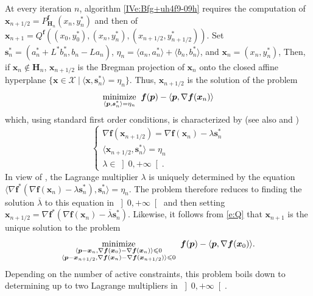 \documentclass[a4paper,11pt,fleqn]{article}
\renewcommand{\leq}{\ensuremath{\leqslant}}
\newcommand{\minimize}[2]{\ensuremath{\underset{\substack{{#1}}}%
{\text{\rm minimize}}\;\;#2 }}
\newcommand{\pair}[2]{\langle{{#1},{#2}}\rangle}
\newcommand{\menge}[2]{\big\{{#1}~\big |~{#2}\big\}}
\newcommand{\XXX}{\ensuremath{\boldsymbol{\mathcal X}}}
\newcommand{\RPP}{\ensuremath{\left]0,+\infty\right[}}
\theoremstyle{plain}{\theorembodyfont{\rmfamily}%
\newtheorem{conjecture}[theorem]{Conjecture}}
\theoremstyle{plain}{\theorembodyfont{\rmfamily}%
\newtheorem{example}[theorem]{Example}}
\theoremstyle{plain}{\theorembodyfont{\rmfamily}%
\newtheorem{remark}[theorem]{Remark}}
\theoremstyle{plain}{\theorembodyfont{\rmfamily}%
\newtheorem{algorithm}[theorem]{Algorithm}}
\theoremstyle{plain}{\theorembodyfont{\rmfamily}%
\newtheorem{condition}[theorem]{Condition}}
\theoremstyle{plain}{\theorembodyfont{\rmfamily}%
\newtheorem{definition}[theorem]{Definition}}
\theoremstyle{plain}{\theorembodyfont{\rmfamily}
\newtheorem{problem}[theorem]{Problem}}
\theoremstyle{plain}{\theorembodyfont{\rmfamily}
\newtheorem{notation}[theorem]{Notation}}
\numberwithin{equation}{section}
\begin{document}
\begin{remark}
\label{rvb8uh4504}
At every iteration $n$, algorithm \eqref{IVe:Bfg+uh4f9-09h}
requires the computation of $\boldsymbol{x}_{n+1/2}=
P_{\boldsymbol{H}_n}^{\boldsymbol{f}}(x_n,y_n^*)$ and then of
$\boldsymbol{x}_{n+1}=Q^{\boldsymbol{f}}((x_0,y_0^*),(x_n,y_n^*),
(x_{n+1/2},y_{n+1/2}^*))$. 
Set $\boldsymbol{s}_n^*=(a_n^*+L^*b_n^*,b_n-La_n)$, 
$\eta_n=\pair{a_n}{a_n^*}+\pair{b_n}{b_n^*}$, and
$\boldsymbol{x}_n=(x_n,y_n^*)$,
Then, if $\boldsymbol{x}_n\not\in\boldsymbol{H}_n$, 
$\boldsymbol{x}_{n+1/2}$ is the Bregman projection of 
$\boldsymbol{x}_n$ onto the closed affine 
hyperplane $\menge{\boldsymbol{x}\in\XXX}
{\pair{\boldsymbol{x}}{\boldsymbol{s}_n^*}=\eta_n}$. Thus,
$\boldsymbol{x}_{n+1/2}$ is the solution of the problem 
\begin{equation}
\label{evb8uh4505a}
\minimize{\pair{\boldsymbol{p}}{\boldsymbol{s}_n^*}=\eta_n}
{\boldsymbol{f}(\boldsymbol{p})-\pair{\boldsymbol{p}}{\nabla
\boldsymbol{f}(\boldsymbol{x}_n)}}
\end{equation}
which, using standard first order conditions, is characterized by
(see also \cite[Remark~6.13]{BB97} and 
\cite[Lemma~2.2.1]{Cens97}) 
\begin{equation}
\label{evb8uh4505b}
\begin{cases}
\nabla\boldsymbol{f}(\boldsymbol{x}_{n+1/2})=\nabla
\boldsymbol{f}(\boldsymbol{x}_n)-\lambda\boldsymbol{s}_n^*\\
\pair{\boldsymbol{x}_{n+1/2}}{\boldsymbol{s}_n^*}=\eta_n\\
\lambda\in\RPP.
\end{cases}
\end{equation}
In view of \cite[Theorem~5.10]{Ccm01}, the Lagrange multiplier 
$\lambda$ is uniquely determined by the equation 
$\pair{\nabla\boldsymbol{f}^*(\nabla\boldsymbol{f}
(\boldsymbol{x}_n)-\lambda\boldsymbol{s}_n^*)}
{\boldsymbol{s}_n^*}=\eta_n$. The problem therefore reduces to
finding the solution $\overline{\lambda}$ to this equation in $\RPP$
and then setting $\boldsymbol{x}_{n+1/2}=\nabla\boldsymbol{f}^*(
\nabla\boldsymbol{f}(\boldsymbol{x}_n)-\overline{\lambda}
\boldsymbol{s}_n^*)$. Likewise, it follows from \eqref{e:Q} that 
$\boldsymbol{x}_{n+1}$ is the unique solution to the problem 
\begin{equation}
\label{evb8uh4505c}
\minimize{\substack{\pair{\boldsymbol{p}-\boldsymbol{x}_n}
{\nabla\boldsymbol{f}(\boldsymbol{x}_0)-
\nabla\boldsymbol{f}(\boldsymbol{x}_n)}\leq 0\\
\pair{\boldsymbol{p}-\boldsymbol{x}_{n+1/2}}
{\nabla\boldsymbol{f}(\boldsymbol{x}_{n})-
\nabla\boldsymbol{f}(\boldsymbol{x}_{n+1/2})}\leq 0}}
{\boldsymbol{f}(\boldsymbol{p})-\pair{\boldsymbol{p}}{\nabla
\boldsymbol{f}(\boldsymbol{x}_0)}}.
\end{equation}
Depending on the number of active constraints, this 
problem boils down to determining 
up to two Lagrange multipliers in $\RPP$.
\end{remark}
\end{document}
